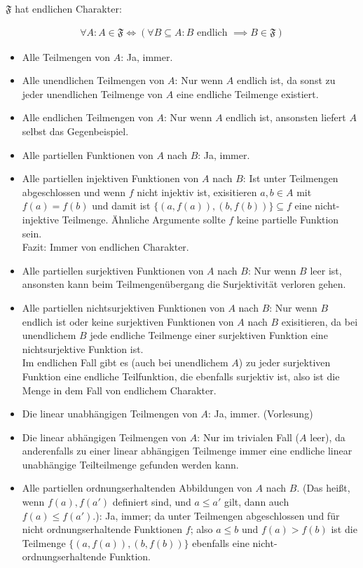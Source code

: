 \begin{solution}

$\mathfrak{F}$ hat endlichen Charakter:

\begin{align*}
  \forall A: A \in \mathfrak{F} \iff (\forall B \subseteq A: B \text{ endlich } \implies B \in \mathfrak{F})
\end{align*}
\begin{itemize}
  \item Alle Teilmengen von $A$: Ja, immer.
  \item Alle unendlichen Teilmengen von $A$: Nur wenn $A$ endlich ist, da
  sonst zu jeder unendlichen Teilmenge von $A$ eine endliche Teilmenge existiert.
  \item Alle endlichen Teilmengen von $A$: Nur wenn $A$ endlich ist, ansonsten
  liefert $A$ selbst das Gegenbeispiel.
  \item Alle partiellen Funktionen von $A$ nach $B$: Ja, immer.
  \item Alle partiellen injektiven Funktionen von $A$ nach $B$: Ist unter Teilmengen abgeschlossen
  und wenn $f$ nicht injektiv ist, exisitieren $a,b \in A$ mit $f(a) = f(b)$ und
  damit ist $\{(a,f(a)),(b,f(b))\} \subseteq f$ eine nicht-injektive Teilmenge.
  Ähnliche Argumente sollte $f$ keine partielle Funktion sein. \\
  Fazit: Immer von endlichen Charakter.
  \item Alle partiellen surjektiven Funktionen von $A$ nach $B$: Nur wenn $B$ leer ist,
  ansonsten kann beim Teilmengenübergang die Surjektivität verloren gehen.
  \item Alle partiellen nichtsurjektiven Funktionen von $A$ nach $B$: Nur wenn $B$ endlich ist oder keine surjektiven Funktionen von $A$ nach $B$ exisitieren,
  da bei unendlichem $B$ jede endliche Teilmenge einer surjektiven Funktion eine
  nichtsurjektive Funktion ist. \\
  Im endlichen Fall gibt es (auch bei unendlichem $A$) zu jeder surjektiven Funktion
  eine endliche Teilfunktion, die ebenfalls surjektiv ist, also ist die Menge
  in dem Fall von endlichem Charakter.
  \item Die linear unabhängigen Teilmengen von $A$: Ja, immer. (Vorlesung)
  \item Die linear abhängigen Teilmengen von $A$: Nur im trivialen Fall ($A$ leer),
  da anderenfalls zu einer linear abhängigen Teilmenge immer eine endliche linear
  unabhängige Teilteilmenge gefunden werden kann.
  \item Alle partiellen ordnungserhaltenden Abbildungen von $A$ nach $B$.
  (Das heißt, wenn $f(a), f(a')$ definiert sind, und $a \leq a'$ gilt, dann
  auch $f(a) \leq f(a')$.): Ja, immer; da unter Teilmengen abgeschlossen und für
  nicht ordnungserhaltende Funktionen $f$; also $a \leq b$ und $f(a) > f(b)$
  ist die Teilmenge $\{(a,f(a)),(b,f(b))\}$ ebenfalls eine nicht-ordnungserhaltende
  Funktion.
\end{itemize}

\end{solution}

